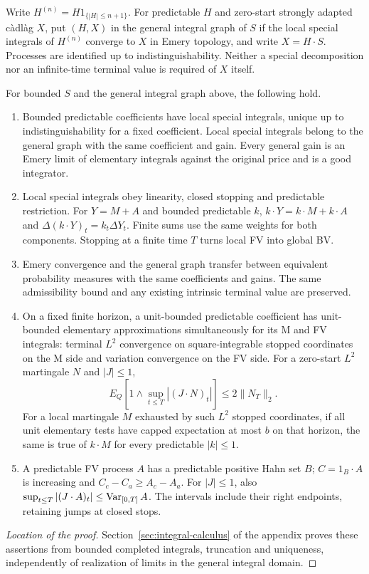 \begin{definition}\label{def:general-graph}
Write $H^{(n)}=H1_{\{|H|\leq n+1\}}$.
For predictable $H$ and zero-start strongly adapted c\`adl\`ag $X$, put
$(H,X)$ in the general integral graph of $S$ if the local special integrals
of $H^{(n)}$ converge to $X$ in Emery topology, and write $X=H\cdot S$.
Processes are identified up to indistinguishability. Neither a special
decomposition nor an infinite-time terminal value is required of $X$ itself.
\end{definition}

\begin{theorem}\label{thm:integral-input}
For bounded $S$ and the general integral graph above, the following hold.
\begin{enumerate}
\item Bounded predictable coefficients have local special integrals, unique
up to indistinguishability for a fixed coefficient. Local special integrals
belong to the general graph with the same coefficient and gain.
Every general gain is an Emery limit of elementary integrals against the
original price and is a good integrator.
\item Local special integrals obey linearity, closed stopping and predictable
restriction. For $Y=M+A$ and bounded predictable $k$,
$k\cdot Y=k\cdot M+k\cdot A$ and
$\Delta(k\cdot Y)_t=k_t\Delta Y_t$.
Finite sums use the same weights for both components. Stopping at a finite
time $T$ turns local FV into global BV.
\item Emery convergence and the general graph transfer between equivalent
probability measures with the same coefficients and gains. The same
admissibility bound and any existing intrinsic terminal value are preserved.
\item On a fixed finite horizon, a unit-bounded predictable coefficient has
unit-bounded elementary approximations simultaneously for its M and FV
integrals: terminal $L^2$ convergence on square-integrable stopped coordinates on the M side and
variation convergence on the FV side.
For a zero-start $L^2$ martingale $N$ and $|J|\leq1$,
\[
 E_Q[1\wedge\sup_{t\leq T}|(J\cdot N)_t|]\leq2\|N_T\|_2.
\]
For a local martingale $M$ exhausted by such $L^2$ stopped coordinates,
if all unit elementary tests have capped
expectation at most $b$ on that horizon, the same is true of $k\cdot M$
for every predictable $|k|\leq1$.
\item A predictable FV process $A$ has a predictable positive Hahn set $B$;
$C=1_B\cdot A$ is increasing and $C_c-C_a\geq A_c-A_a$.
For $|J|\leq1$, also
$\sup_{t\leq T}|(J\cdot A)_t|\leq\operatorname{Var}_{[0,T]}A$.
The intervals include their right endpoints, retaining jumps at closed stops.
\end{enumerate}
\end{theorem}
\begin{proof}[Location of the proof]
Section~\ref{sec:integral-calculus} of the appendix proves these assertions
from bounded completed integrals, truncation and uniqueness, independently
of realization of limits in the general integral domain.
\end{proof}

